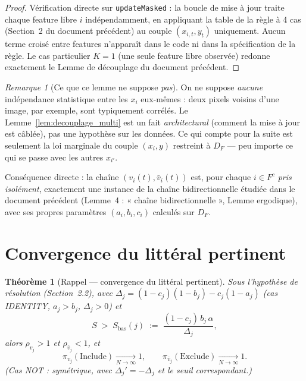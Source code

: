 \documentclass[12pt,a4paper]{article}
\newtheorem{theorem}{Théorème}[section]
\theoremstyle{remark}
\newtheorem{remark}{Remarque}[section]
\newcommand{\Inc}{\ensuremath{\mathrm{Include}}}
\newcommand{\Exc}{\ensuremath{\mathrm{Exclude}}}
\newcommand{\vbar}{\bar{v}}
\newcommand{\DF}{D_F}
\begin{document}
\begin{proof}
Vérification directe sur \texttt{updateMasked} : la boucle de mise à jour traite
chaque feature libre $i$ indépendamment, en appliquant la table de la règle à 4 cas
(Section~2 du document précédent) au couple $(x_{i,t}, y_t)$ uniquement. Aucun terme
croisé entre features n'apparaît dans le code ni dans la spécification de la règle.
Le cas particulier $K=1$ (une seule feature libre observée) redonne exactement le
Lemme de découplage du document précédent.
\end{proof}

\begin{remark}[Ce que ce lemme ne suppose \emph{pas}]
On ne suppose \emph{aucune} indépendance statistique entre les $x_i$ eux-mêmes :
deux pixels voisins d'une image, par exemple, sont typiquement corrélés. Le
Lemme~\ref{lem:decouplage_multi} est un fait \emph{architectural} (comment la mise à
jour est câblée), pas une hypothèse sur les données. Ce qui compte pour la suite est
seulement la loi marginale du couple $(x_i, y)$ restreint à $\DF$ --- peu importe
ce qui se passe avec les autres $x_{i'}$.
\end{remark}

Conséquence directe : la chaîne $(v_i(t),\vbar_i(t))$ est, pour chaque $i\in F^c$
\emph{pris isolément}, exactement une instance de la chaîne bidirectionnelle étudiée
dans le document précédent (Lemme~4 : « chaîne bidirectionnelle », Lemme ergodique),
avec ses propres paramètres $(a_i,b_i,c_i)$ calculés sur $\DF$.

\section{Convergence du littéral pertinent}

\begin{theorem}[Rappel --- convergence du littéral pertinent]\label{thm:pertinent}
Sous l'hypothèse de résolution (Section~2.2), avec $\Delta_j =
(1-c_j)(1-b_j)-c_j(1-a_j)$ (cas IDENTITY, $a_j>b_j$, $\Delta_j>0$) et
\[
  S \;>\; S_{\text{bas}}(j) \;:=\; \frac{(1-c_j)\,b_j\,\alpha}{\Delta_j},
\]
alors $\rho_{v_j}>1$ et $\rho_{\vbar_j}<1$, et
\[
  \pi_{v_j}(\Inc) \xrightarrow[N\to\infty]{} 1, \qquad
  \pi_{\vbar_j}(\Exc) \xrightarrow[N\to\infty]{} 1.
\]
(Cas NOT : symétrique, avec $\Delta_j'=-\Delta_j$ et le seuil correspondant.)
\end{theorem}
\end{document}
